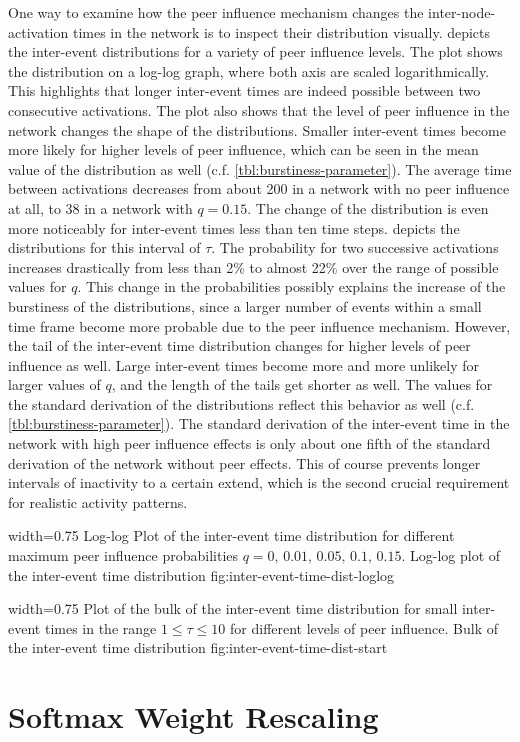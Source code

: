 One way to examine how the peer influence mechanism changes the inter-node-activation times in the network is to inspect their distribution visually.
 depicts the inter-event distributions for a variety of peer influence levels.
The plot shows the distribution on a log-log graph, where both axis are scaled logarithmically.
This highlights that longer inter-event times are indeed possible between two consecutive activations.
The plot also shows that the level of peer influence in the network changes the shape of the distributions.
Smaller inter-event times become more likely for higher levels of peer influence, which can be seen in the mean value of the distribution as well (c.f. \cref{tbl:burstiness-parameter}).
The average time between activations decreases from about 200 in a network with no peer influence at all, to 38 in a network with \( q = 0.15 \).
The change of the distribution is even more noticeably for inter-event times less than ten time steps.
 depicts the distributions for this interval of \( \tau \).
The probability for two successive activations increases drastically from less than 2\% to almost 22\% over the range of possible values for \( q \).
This change in the probabilities possibly explains the increase of the burstiness of the distributions, since a larger number of events within a small time frame become more probable due to the peer influence mechanism.
However, the tail of the inter-event time distribution changes for higher levels of peer influence as well.
Large inter-event times become more and more unlikely for larger values of \( q \), and the length of the tails get shorter as well.
The values for the standard derivation of the distributions reflect this behavior as well (c.f. \cref{tbl:burstiness-parameter}).
The standard derivation of the inter-event time in the network with high peer influence effects is only about one fifth of the standard derivation of the network without peer effects.
This of course prevents longer intervals of inactivity to a certain extend, which is the second crucial requirement for realistic activity patterns.


      {width=0.75\textwidth}
      {Log-log Plot of the inter-event time distribution for different maximum peer influence probabilities \( q = 0, \, 0.01, \, 0.05, \, 0.1, \, 0.15\).}
      {Log-log plot of the inter-event time distribution}
      {fig:inter-event-time-dist-loglog}


      {width=0.75\textwidth}
      {Plot of the bulk of the inter-event time distribution for small inter-event times in the range \( 1 \leq \tau \leq 10 \) for different levels of peer influence.}
      {Bulk of the inter-event time distribution}
      {fig:inter-event-time-dist-start}





\section{Softmax Weight Rescaling}
\label{sec:softmax-rescaling}
